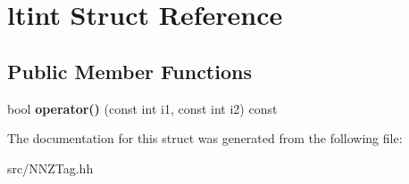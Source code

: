 \hypertarget{structltint}{
\section{ltint Struct Reference}
\label{structltint}
}
\subsection*{Public Member Functions}
\begin{DoxyCompactItemize}
\item 
\hypertarget{structltint_a66c11c4b7988f5144663a9d5120cda73}{
bool {\bfseries operator()} (const int i1, const int i2) const }
\label{structltint_a66c11c4b7988f5144663a9d5120cda73}

\end{DoxyCompactItemize}


The documentation for this struct was generated from the following file:\begin{DoxyCompactItemize}
\item 
src/NNZTag.hh\end{DoxyCompactItemize}
